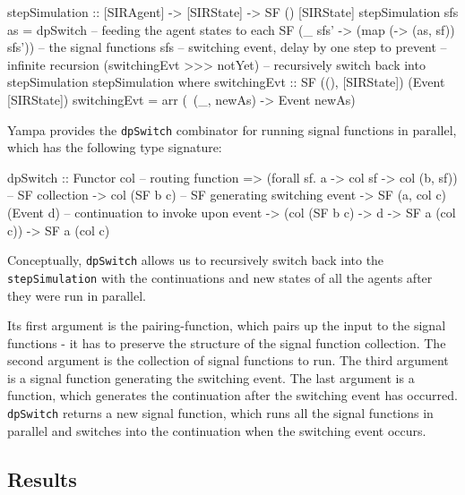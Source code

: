 \begin{HaskellCode}
stepSimulation :: [SIRAgent] -> [SIRState] -> SF () [SIRState]
stepSimulation sfs as =
    dpSwitch
      -- feeding the agent states to each SF
      (\_ sfs' -> (map (\sf -> (as, sf)) sfs'))
      -- the signal functions
      sfs
      -- switching event, delay by one step to prevent
      -- infinite recursion
      (switchingEvt >>> notYet)
      -- recursively switch back into stepSimulation         
      stepSimulation                            
  where
    switchingEvt :: SF ((), [SIRState]) (Event [SIRState])
    switchingEvt = arr (\ (_, newAs) -> Event newAs)
\end{HaskellCode}

Yampa provides the \texttt{dpSwitch} combinator for running signal functions in parallel, which has the following type signature:

\begin{HaskellCode}
dpSwitch :: Functor col
         -- routing function
         => (forall sf. a -> col sf -> col (b, sf))
         -- SF collection
         -> col (SF b c)
         -- SF generating switching event     
         -> SF (a, col c) (Event d)
         -- continuation to invoke upon event           
         -> (col (SF b c) -> d -> SF a (col c))
         -> SF a (col c)
\end{HaskellCode}

Conceptually, \texttt{dpSwitch} allows us to recursively switch back into the \\ \texttt{stepSimulation} with the continuations and new states of all the agents after they were run in parallel. 

Its first argument is the pairing-function, which pairs up the input to the signal functions - it has to preserve the structure of the signal function collection. The second argument is the collection of signal functions to run. The third argument is a signal function generating the switching event. The last argument is a function, which generates the continuation after the switching event has occurred. \texttt{dpSwitch} returns a new signal function, which runs all the signal functions in parallel and switches into the continuation when the switching event occurs. %

\subsection{Results}
\label{sub:timedriven_results}

